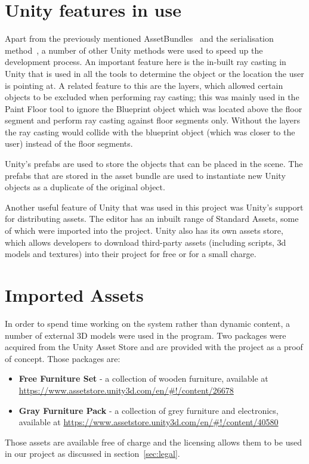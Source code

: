 \section{Unity features in use}
Apart from the previously mentioned AssetBundles~\cite{unity:assetbundle} and the serialisation method~\cite{unity:serialization}, a number of other Unity methods were used to speed up the development process. An important feature here is the in-built ray casting in Unity that is used in all the tools to determine the object or the location the user is pointing at. A related feature to this are the layers, which allowed certain objects to be excluded when performing ray casting; this was mainly used in the Paint Floor tool to ignore the Blueprint object which was located above the floor segment and perform ray casting against floor segments only. Without the layers the ray casting would collide with the blueprint object (which was closer to the user) instead of the floor segments.

Unity's prefabs are used to store the objects that can be placed in the scene. The prefabs that are stored in the asset bundle are used to instantiate new Unity objects as a duplicate of the original object.

Another useful feature of Unity that was used in this project was Unity's support for distributing assets. The editor has an inbuilt range of Standard Assets, some of which were imported into the project. Unity also has its own assets store, which allows developers to download third-party assets (including scripts, 3d models and textures) into their project for free or for a small charge.


\section{Imported Assets}
In order to spend time working on the system rather than dynamic content, a number of external 3D models were used in the program. Two packages were acquired from the Unity Asset Store and are provided with the project as a proof of concept. Those packages are:
\begin{itemize}
    \item \textbf{Free Furniture Set} - a collection of wooden furniture, available at\\ \url{https://www.assetstore.unity3d.com/en/#!/content/26678}
    \item \textbf{Gray Furniture Pack} - a collection of grey furniture and electronics, available at \url{https://www.assetstore.unity3d.com/en/#!/content/40580} 
\end{itemize}

Those assets are available free of charge and the licensing allows them to be used in our project as discussed in section~\ref{sec:legal}.